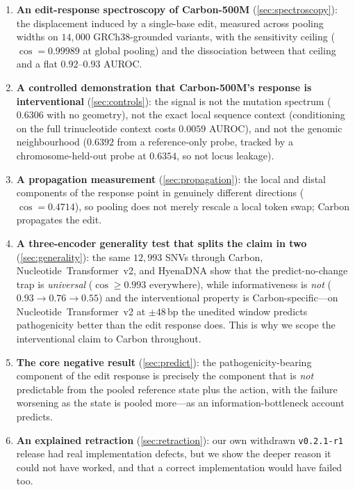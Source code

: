 \documentclass{article}
\newcommand{\carbon}{Carbon-500M\xspace}
\begin{document}
\begin{enumerate}[leftmargin=1.4em,itemsep=1pt,topsep=2pt]
\item \textbf{An edit-response spectroscopy of \carbon} (\cref{sec:spectroscopy}): the
displacement induced by a single-base edit, measured across pooling widths on $14{,}000$
GRCh38-grounded variants, with the sensitivity ceiling ($\cos=0.99989$ at global pooling) and the
dissociation between that ceiling and a flat $0.92$--$0.93$ AUROC.
\item \textbf{A controlled demonstration that \carbon's response is interventional}
(\cref{sec:controls}): the signal is not the mutation spectrum ($0.6306$ with no geometry), not the
exact local sequence context (conditioning on the full trinucleotide context costs $0.0059$ AUROC),
and not the genomic neighbourhood ($0.6392$ from a reference-only probe, tracked by a
chromosome-held-out probe at $0.6354$, so not locus leakage).
\item \textbf{A propagation measurement} (\cref{sec:propagation}): the local and distal components
of the response point in genuinely different directions ($\cos=0.4714$), so pooling does not merely
rescale a local token swap; Carbon propagates the edit.
\item \textbf{A three-encoder generality test that splits the claim in two} (\cref{sec:generality}):
the same $12{,}993$ SNVs through Carbon, Nucleotide~Transformer~v2, and HyenaDNA show that the
predict-no-change trap is \emph{universal} ($\cos\ge0.993$ everywhere), while informativeness is
\emph{not} ($0.93 \to 0.76 \to 0.55$) and the interventional property is Carbon-specific---on
Nucleotide~Transformer~v2 at $\pm48$\,bp the unedited window predicts pathogenicity better than the
edit response does. This is why we scope the interventional claim to Carbon throughout.
\item \textbf{The core negative result} (\cref{sec:predict}): the pathogenicity-bearing component of
the edit response is precisely the component that is \emph{not} predictable from the pooled
reference state plus the action, with the failure worsening as the state is pooled more---as an
information-bottleneck account predicts.
\item \textbf{An explained retraction} (\cref{sec:retraction}): our own withdrawn
\texttt{v0.2.1-r1} release had real implementation defects, but we show the deeper reason it could
not have worked, and that a correct implementation would have failed too.
\end{enumerate}
\end{document}
